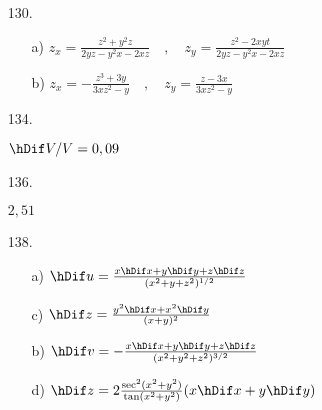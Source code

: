 \documentclass[11pt]{amsbook}
\begin{document}

\begin{enumerate}
 
    \item[130.]
    
        \begin{enumerate}
            
	    \item[a)]
	      $
		z_{x} = \frac {   z^{2} + y^{2} z   }
			      { 2yz - y^{2} x - 2xz }
		\quad ,\quad
		z_{y} = \frac {     z^{2} - 2xyt    }
			      { 2yz - y^{2} x - 2xz }
              $

            \item[b)]
	      $
		z_{x} = - \frac {  z^{3} + 3y  }
				{ 3x z^{2} - y }
		\quad ,\quad
		z_{y} = \frac {    z - 3x    }
			      { 3x z^{2} - y }
              $

	\end{enumerate}
    

    \item[134.]
        
        $ \hDif V / V = 0,09 $
    

    \item[136.]
        
        $ 2,51 $
    
    
    \item[138.]
    
	\begin{multicols}{2}
	    \begin{enumerate}
            
		\item[a)]
		  $
		    \hDif u = \frac { x \hDif x + y \hDif y + z \hDif z }
				    {   ( x^{2} + y + z^{2} )^{ 1/2 }   }
		  $
		  
		\item[c)]
		  $
		    \hDif z = \frac { y^{2} \hDif x + x^{2} \hDif y }
				    {         ( x + y )^{2}         }
		  $

		\item[b)]
		  $
		    \hDif v = - \frac { x \hDif x + y \hDif y + z \hDif z }
				      { ( x^{2} + y^{2} + z^{2} )^{ 3/2 } }
		  $
		  
		\item[d)]
		  $
		    \hDif z = 2 \frac { \mathrm{sec}^{2} ( x^{2} + y^{2} ) }
				      {       \tan ( x^{2} + y^{2} )       }		( x \hDif x + y \hDif y )
		  $


\end{enumerate}
\end{multicols}
\end{enumerate}
\end{document}
